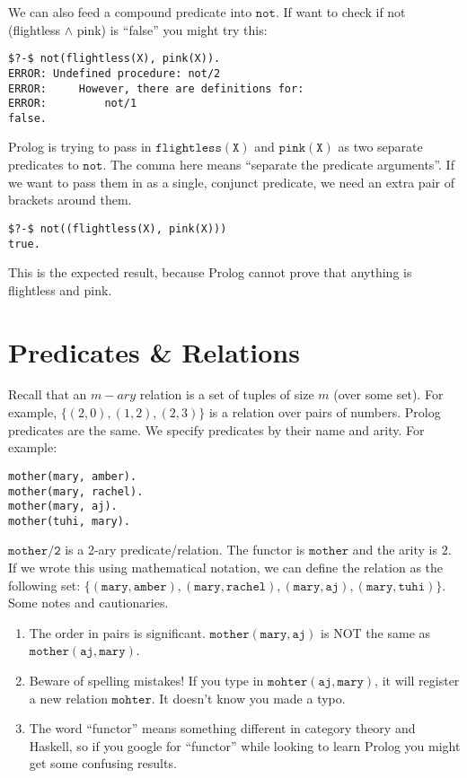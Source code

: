 \documentclass[a4paper,12pt]{article}
\newcommand{\kwa}[1]{\mathtt{#1}}
\begin{document}
\noindent
We can also feed a compound predicate into $\kwa{not}$. If want to check if not (flightless $\land$ pink) is ``false'' you might try this:

\begin{lstlisting}
$?-$ not(flightless(X), pink(X)).
ERROR: Undefined procedure: not/2
ERROR:     However, there are definitions for:
ERROR:         not/1
false.
\end{lstlisting}

\noindent
Prolog is trying to pass in $\kwa{flightless(X)}$ and $\kwa{pink(X)}$ as two separate predicates to $\kwa{not}$. The comma here means ``separate the predicate arguments''. If we want to pass them in as a single, conjunct predicate, we need an extra pair of brackets around them.

\begin{lstlisting}
$?-$ not((flightless(X), pink(X)))
true.
\end{lstlisting}

\noindent
This is the expected result, because Prolog cannot prove that anything is flightless and pink.

\section{Predicates \& Relations}

Recall that an $m-ary$ relation is a set of tuples of size $m$ (over some set). For example, $\{ (2,0), (1,2), (2,3) \}$ is a relation over pairs of numbers. Prolog predicates are the same. We specify predicates by their name and arity. For example:

\begin{lstlisting}
mother(mary, amber).
mother(mary, rachel).
mother(mary, aj).
mother(tuhi, mary).
\end{lstlisting}

\noindent
$\kwa{mother \slash 2}$ is a 2-ary predicate/relation. The functor is $\kwa{mother}$ and the arity is $2$. If we wrote this using mathematical notation, we can define the relation as the following set: $\kwa{ \{ (mary, amber), (mary, rachel), (mary, aj), (mary, tuhi) \} }$. \\

\noindent
Some notes and cautionaries.
\begin{enumerate}
	\item The order in pairs is significant. $\kwa{mother(mary, aj)}$ is NOT the same as $\kwa{mother(aj, mary)}$.
	\item Beware of spelling mistakes! If you type in $\kwa{mohter(aj, mary)}$, it will register a new relation $\kwa{mohter}$. It doesn't know you made a typo.
	\item The word ``functor'' means something different in category theory and Haskell, so if you google for ``functor'' while looking to learn Prolog you might get some confusing results.
\end{enumerate}
\end{document}
